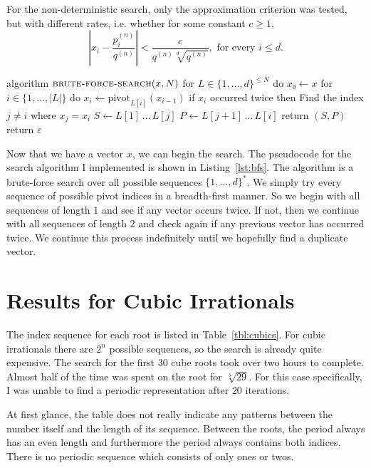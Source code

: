 For the non-deterministic search, only the approximation criterion was tested,
but with different rates, i.e. whether for some constant $c ≥ 1$,
\[
  |x_i - \frac{p_i^{(n)}}{q^{(n)}}| < \frac{c}{q^{(n)} \sqrt[d]{q^{(n)}}}, \text{ for every } i ≤ d.
\]

\begin{Pseudocode}[float=tbp, label={lst:bfs}, caption={The brute-force search algorithm for finding a periodic representation.}]
algorithm $\textsc{brute-force-search}(x, N)$
  for $L ∈ \{1, …, d\}^{≤ N}$ do
    $x₀ ← x$
    for $i ∈ \{1, …, |L|\}$ do
      $x_i ← \mathrm{pivot}_{L[i]}(x_{i-1})$
      if $x_i$ occurred twice then
        Find the index $j ≠ i$ where $x_j = x_i$
        $S ← L[1] \,…\, L[j]$
        $P ← L[j+1] \,…\, L[i]$
        return $(S, P)$
  return $ε$
\end{Pseudocode}

Now that we have a vector $x$, we can begin the search.
The pseudocode for the search algorithm I implemented is shown in Listing~\ref{lst:bfs}.
The algorithm is a brute-force search over all possible sequences $\{1,\dots,d\}^*$.
We simply try every sequence of possible pivot indices in a breadth-first manner.
So we begin with all sequences of length $1$ and see if any vector occurs twice.
If not, then we continue with all sequences of length $2$ and check again if
any previous vector has occurred twice.
We continue this process indefinitely until we hopefully find a duplicate vector.

\section{Results for Cubic Irrationals}

The index sequence for each root is listed in Table~\ref{tbl:cubics}.
For cubic irrationals there are $2^n$ possible sequences,
so the search is already quite expensive.
The search for the first 30 cube roots took over two hours to complete.
Almost half of the time was spent on the root for $\sqrt[3]{29}$.
For this case specifically, I was unable to find a periodic representation
after $20$ iterations. %

At first glance, the table does not really indicate any patterns between the
number itself and the length of its sequence.
Between the roots, the period always has an even length
and furthermore the period always contains both indices.
There is no periodic sequence which consists of only ones or twos.

